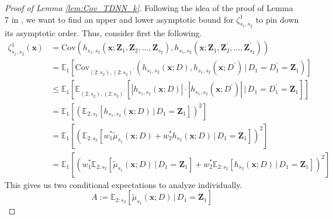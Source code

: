 \documentclass[letterpaper,10pt]{article}
\numberwithin{equation}{section}
\numberwithin{thm}{section}
\numberwithin{lem}{section}
\numberwithin{cor}{section}
\newcommand{\E}{\mathbb{E}}
\newcommand{\1}{\mathbbm{1}}
\newcommand{\Cov}{\text{Cov}}
\begin{document}
\begin{proof}[Proof of Lemma \ref{lem:Cov_TDNN_k}]
	Following the idea of the proof of Lemma 7 in \citet{demirkaya_optimal_2024}, we want to find an upper and lower asymptotic bound for $\zeta_{s_1, s_2}^{1}$ to pin down its asymptotic order.
	Thus, consider first the following.
	\begin{equation}
		\begin{aligned}
			\zeta_{s_1, s_2}^{1}\left(\mathbf{x}\right)
			 & = \Cov\left(
			h_{s_1, s_2}\left(\mathbf{x}; \mathbf{Z}_1, \mathbf{Z}_2, \ldots, \mathbf{Z}_{s_2}\right),
			h_{s_1, s_2}\left(\mathbf{x}; \mathbf{Z}_1, \mathbf{Z}_{2}^{\prime}, \ldots, \mathbf{Z}_{s_2}^{\prime}\right)
			\right)                                                  \\
			 & = \E_{1}\left[\Cov_{(2:s_2), (2:s_2)^{\prime}}\left(
				h_{s_1, s_2}\left(\mathbf{x}; D\right),
				h_{s_1, s_2}\left(\mathbf{x}; D^{\prime}\right)
				\, \Big| \, D_1 = D_{1}^{\prime} = \mathbf{Z}_1\right)
			\right]                                                  \\
			 & \leq \E_{1}\left[\E_{(2:s_2), (2:s_2)^{\prime}}\left[
			|h_{s_1, s_2}\left(\mathbf{x}; D\right)| \cdot
			|h_{s_1, s_2}\left(\mathbf{x}; D^{\prime}\right)|
			\, \Big| \, D_1 = D_{1}^{\prime} = \mathbf{Z}_1\right]
			\right]                                                  \\
			 & = \E_{1}\left[\left(\E_{2:s_2}\left[
					h_{s_1, s_2}\left(\mathbf{x}; D\right)
					\, \Big| \, D_1 = \mathbf{Z}_1\right]\right)^{2}
			\right]                                                  \\
			 & = \E_{1}\left[\left(\E_{2:s_2}\left[
					w_{1}^{*} \tilde{\mu}_{s_1}\left(\mathbf{x}; D\right) + w_{2}^{*} h_{s_2}\left(\mathbf{x}; D\right)
					\, \Big| \, D_1 = \mathbf{Z}_1\right]\right)^{2}
			\right]                                                  \\
			 & = \E_{1}\left[\left(
				w_{1}^{*} \E_{2:s_2}\left[\tilde{\mu}_{s_1}\left(\mathbf{x}; D\right)\, \Big| \, D_1 = \mathbf{Z}_1\right]
				+ w_{2}^{*} \E_{2:s_2}\left[h_{s_2}\left(\mathbf{x}; D\right)\, \Big| \, D_1 = \mathbf{Z}_1\right]
				\right)^{2}
				\right]
		\end{aligned}
	\end{equation}
	This gives us two conditional expectations to analyze individually.
	\begin{equation}
		A := \E_{2:s_2}\left[\tilde{\mu}_{s_1}\left(\mathbf{x}; D\right)\, \Big| \, D_1 = \mathbf{Z}_1\right]

\end{equation}
\end{proof}
\end{document}
